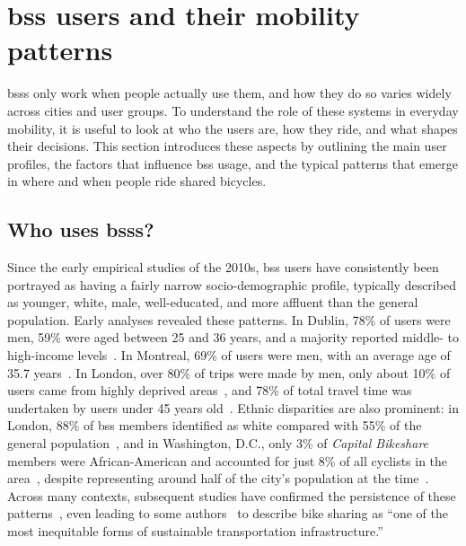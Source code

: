    
\section[BSS users and their mobility patterns]{\ac{bss} users and their mobility patterns}
\label{sec:bss_users_and_their_mobility_patterns}

\acp{bss} only work when people actually use them, and how they do so varies widely across cities and user groups. To understand the role of these systems in everyday mobility, it is useful to look at who the users are, how they ride, and what shapes their decisions. This section introduces these aspects by outlining the main user profiles, the factors that influence \ac{bss} usage, and the typical patterns that emerge in where and when people ride shared bicycles.

\subsection[Who uses BSSs?]{Who uses \acp{bss}?}
\label{sec:who_uses_bss}

Since the early empirical studies of the 2010s, \ac{bss} users have consistently been portrayed as having a fairly narrow socio-demographic profile, typically described as younger, white, male, well-educated, and more affluent than the general population. Early analyses revealed these patterns. In Dublin, 78\% of users were men, 59\% were aged between 25 and 36 years, and a majority reported middle- to high-income levels~\cite{Murphy2015}. In Montreal, 69\% of users were men, with an average age of 35.7 years~\cite{BachandMarleau2012}. In London, over 80\% of trips were made by men, only about 10\% of users came from highly deprived areas~\cite{Goodman2014}, and 78\% of total travel time was undertaken by users under 45 years old~\cite{Woodcock2014}. Ethnic disparities are also prominent: in London, 88\% of \ac{bss} members identified as white compared with 55\% of the general population~\cite{Fishman2016}, and in Washington, D.C., only 3\% of \textit{Capital Bikeshare} members were African-American and accounted for just 8\% of all cyclists in the area~\cite{Buck2013}, despite representing around half of the city’s population at the time~\cite{Fishman2016}. Across many contexts, subsequent studies have confirmed the persistence of these patterns~\cite{Shaheen2014, Fishman2013, Fishman2014, Bauman2017, Ogilvie2012, Steinbach2011, Willberg2021, Waldner2025}, even leading to some authors~\cite{Hoffmann2016} to describe bike sharing as “one of the most inequitable forms of sustainable transportation infrastructure.”

